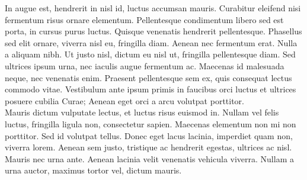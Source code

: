 In augue est, hendrerit in nisl id, luctus accumsan mauris. Curabitur eleifend nisi fermentum risus ornare elementum. Pellentesque condimentum libero sed est porta, in cursus purus luctus. Quisque venenatis hendrerit pellentesque. Phasellus sed elit ornare, viverra nisl eu, fringilla diam. Aenean nec fermentum erat. Nulla a aliquam nibh. Ut justo nisl, dictum eu nisl ut, fringilla pellentesque diam. Sed ultrices ipsum urna, nec iaculis augue fermentum ac. Maecenas id malesuada neque, nec venenatis enim. Praesent pellentesque sem ex, quis consequat lectus commodo vitae. Vestibulum ante ipsum primis in faucibus orci luctus et ultrices posuere cubilia Curae; Aenean eget orci a arcu volutpat porttitor.\\

Mauris dictum vulputate lectus, et luctus risus euismod in. Nullam vel felis luctus, fringilla ligula non, consectetur sapien. Maecenas elementum non mi non porttitor. Sed id volutpat tellus. Donec eget lacus lacinia, imperdiet quam non, viverra lorem. Aenean sem justo, tristique ac hendrerit egestas, ultrices ac nisl. Mauris nec urna ante. Aenean lacinia velit venenatis vehicula viverra. Nullam a urna auctor, maximus tortor vel, dictum mauris.




